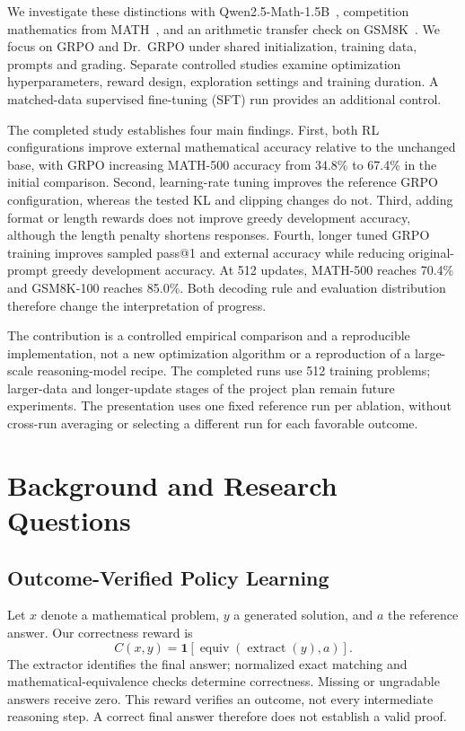 \documentclass[conference]{IEEEtran}
\begin{document}
We investigate these distinctions with Qwen2.5-Math-1.5B~\cite{qwen}, competition mathematics from MATH~\cite{math}, and an arithmetic transfer check on GSM8K~\cite{gsm8k}. We focus on GRPO and Dr.~GRPO under shared initialization, training data, prompts and grading. Separate controlled studies examine optimization hyperparameters, reward design, exploration settings and training duration. A matched-data supervised fine-tuning (SFT) run provides an additional control.

The completed study establishes four main findings. First, both RL configurations improve external mathematical accuracy relative to the unchanged base, with GRPO increasing MATH-500 accuracy from 34.8\% to 67.4\% in the initial comparison. Second, learning-rate tuning improves the reference GRPO configuration, whereas the tested KL and clipping changes do not. Third, adding format or length rewards does not improve greedy development accuracy, although the length penalty shortens responses. Fourth, longer tuned GRPO training improves sampled pass@1 and external accuracy while reducing original-prompt greedy development accuracy. At 512 updates, MATH-500 reaches 70.4\% and GSM8K-100 reaches 85.0\%. Both decoding rule and evaluation distribution therefore change the interpretation of progress.

The contribution is a controlled empirical comparison and a reproducible implementation, not a new optimization algorithm or a reproduction of a large-scale reasoning-model recipe. The completed runs use 512 training problems; larger-data and longer-update stages of the project plan remain future experiments. The presentation uses one fixed reference run per ablation, without cross-run averaging or selecting a different run for each favorable outcome.

\section{Background and Research Questions}
\subsection{Outcome-Verified Policy Learning}
Let $x$ denote a mathematical problem, $y$ a generated solution, and $a$ the reference answer. Our correctness reward is
\begin{equation}
C(x,y)=\mathbf{1}\!\left[\operatorname{equiv}(\operatorname{extract}(y),a)\right].
\end{equation}
The extractor identifies the final answer; normalized exact matching and mathematical-equivalence checks determine correctness. Missing or ungradable answers receive zero. This reward verifies an outcome, not every intermediate reasoning step. A correct final answer therefore does not establish a valid proof.
\end{document}
